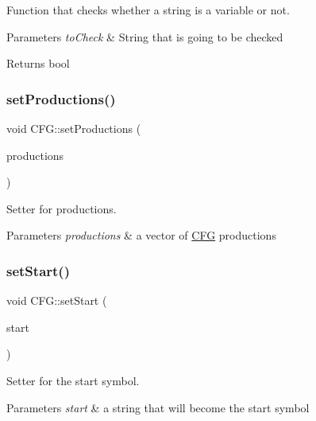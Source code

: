 Function that checks whether a string is a variable or not. 


\begin{DoxyParams}{Parameters}
{\em to\+Check} & String that is going to be checked \\
\hline
\end{DoxyParams}
\begin{DoxyReturn}{Returns}
bool 
\end{DoxyReturn}
\mbox{\label{classCFG_a0901757d0f9369339ebf933b611e244e}} 
\subsubsection{\texorpdfstring{set\+Productions()}{setProductions()}}
{\footnotesize\ttfamily void C\+F\+G\+::set\+Productions (\begin{DoxyParamCaption}\item[{const std\+::vector$<$ \hyperlink{classCFGProduction}{C\+F\+G\+Production} $>$ \&}]{productions }\end{DoxyParamCaption})}



Setter for productions. 


\begin{DoxyParams}{Parameters}
{\em productions} & a vector of \hyperlink{classCFG}{C\+FG} productions \\
\hline
\end{DoxyParams}
\mbox{\label{classCFG_adb6a876a834b63968c8389b8d632cfc0}} 
\subsubsection{\texorpdfstring{set\+Start()}{setStart()}}
{\footnotesize\ttfamily void C\+F\+G\+::set\+Start (\begin{DoxyParamCaption}\item[{const std\+::string \&}]{start }\end{DoxyParamCaption})}



Setter for the start symbol. 


\begin{DoxyParams}{Parameters}
{\em start} & a string that will become the start symbol \\
\hline
\end{DoxyParams}
\mbox{\label{classCFG_afa23352455a95ef16da68fea06c9f3aa}} 
